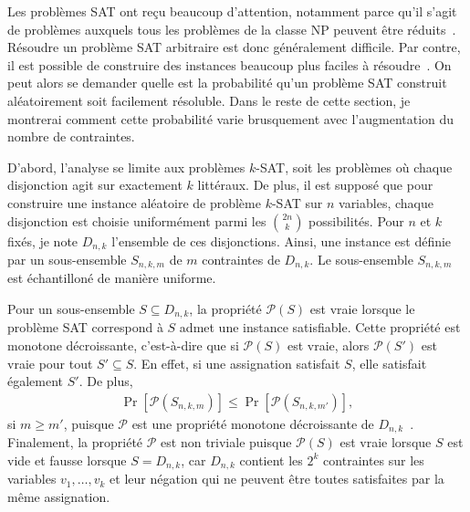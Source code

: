 Les problèmes SAT ont reçu beaucoup d’attention,
notamment parce qu’il s’agit de problèmes auxquels tous les problèmes de la classe NP
peuvent être réduits~\cite{cook_complexity_1971}.
Résoudre un problème SAT arbitraire est donc généralement difficile.
Par contre, il est possible de construire des instances beaucoup
plus faciles à résoudre~\cite{cheeseman_where_1991}.
On peut alors se demander quelle est la probabilité qu’un problème SAT construit
aléatoirement soit facilement résoluble.
Dans le reste de cette section, je montrerai comment cette probabilité varie brusquement
avec l’augmentation du nombre de contraintes.

D'abord,
l'analyse se limite aux problèmes $k$-SAT,
soit les problèmes où chaque disjonction agit sur exactement $k$ littéraux.
De plus,
il est supposé que pour construire une instance aléatoire de problème $k$-SAT sur $n$ variables,
chaque disjonction est choisie uniformément parmi les $\binom{2n}{k}$ possibilités.
Pour $n$ et $k$ fixés, je note $D_{n,k}$ l'ensemble de ces disjonctions.
Ainsi, une instance est définie par un sous-ensemble $S_{n,k,m}$ de $m$ contraintes de $D_{n, k}$.
Le sous-ensemble $S_{n, k, m}$ est échantilloné de manière uniforme. 

Pour un sous-ensemble $S \subseteq D_{n, k}$,
la propriété $\mathcal P(S)$ est vraie lorsque le problème SAT correspond à $S$
admet une instance satisfiable.
Cette propriété est monotone décroissante,
c'est-à-dire que si $\mathcal P(S)$ est vraie,
alors $\mathcal P(S')$ est vraie pour tout $S' \subseteq S$.
En effet,
si une assignation satisfait $S$, elle satisfait également $S'$.
De plus,
\begin{align}
  \Pr[\mathcal P(S_{n, k, m})] \leq 
  \Pr[\mathcal P(S_{n, k, m'})],
\end{align}
si $m \geq m'$,
puisque $\mathcal P$ est une propriété monotone décroissante 
de $D_{n, k}$~\cite{bollobas_threshold_1987}.
Finalement, la propriété $\mathcal P$ est non triviale puisque
$\mathcal P(S)$ est vraie lorsque $S$ est vide et fausse lorsque $S = D_{n, k}$,
car $D_{n, k}$ contient les $2^k$ contraintes
sur les variables $v_1, \ldots, v_k$ et leur négation
qui ne peuvent être toutes satisfaites par la même assignation.

